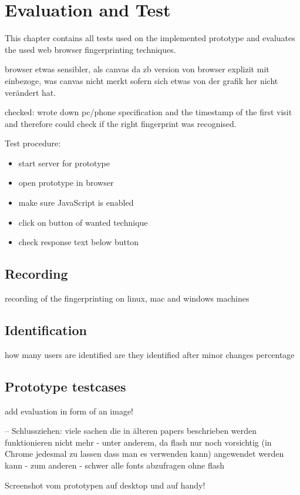 \chapter{Evaluation and Test}
\label{cha:evaluation}

This chapter contains all tests used on the implemented prototype and evaluates the used web browser fingerprinting techniques.

browser etwas sensibler, als canvas da zb version von browser explizit mit einbezoge, was canvas nicht merkt sofern sich etwas von der grafik her nicht verändert hat.

checked: wrote down pc/phone specification and the timestamp of the first visit and therefore could check if the right fingerprint was recognised.

Test procedure:
\begin{itemize}
\item start server for prototype
\item open prototype in browser
\item make sure JavaScript is enabled
\item click on button of wanted technique
\item check response text below button
\end{itemize}

\section{Recording}
recording of the fingerprinting
on linux, mac and windows machines

\section{Identification}
how many users are identified
are they identified after minor changes
percentage

\section{Prototype testcases}

add evaluation in form of an image!

--
Schlussziehen: viele sachen die in älteren papers beschrieben werden funktionieren nicht mehr
- unter anderem, da flash nur noch vorsichtig (in Chrome jedesmal zu lassen dass man es verwenden kann) angewendet werden kann
- zum anderen - schwer alle fonts abzufragen ohne flash 


Screenshot vom prototypen
auf desktop und auf handy!

